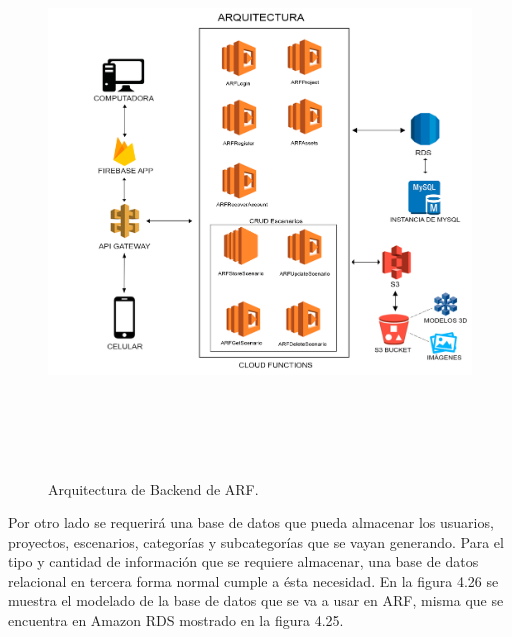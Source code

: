 \begin{figure}[H]
	\centering
	\includegraphics[width=15cm,height=15cm]{imagenes/desarrollo/arquitectura/ArchitecturaBackend.png}
	\caption{Arquitectura de Backend de ARF.}
	\label{fig:arqbackend}
\end{figure}
\par
Por otro lado se requerirá una base de datos que pueda almacenar los usuarios, proyectos, escenarios, categorías y subcategorías que se vayan generando. Para el tipo y cantidad de información que se requiere almacenar, una base de datos relacional en tercera forma normal cumple a ésta necesidad.
En la figura 4.26 se muestra el modelado de la base de datos que se va a usar en ARF, misma que se encuentra en Amazon RDS mostrado en la figura 4.25.
